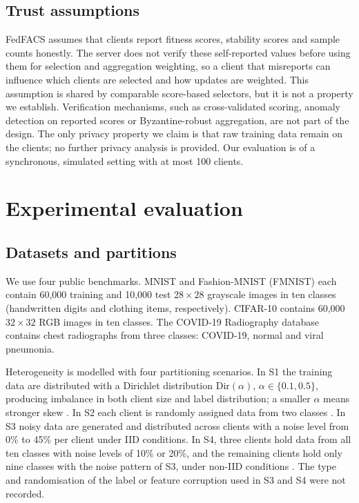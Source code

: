 \documentclass[pdflatex,sn-basic]{sn-jnl}
\begin{document}
\subsection{Trust assumptions}\label{sec4.10}
FedFACS assumes that clients report fitness scores, stability scores and sample counts honestly. The server does not verify these self-reported values before using them for selection and aggregation weighting, so a client that misreports can influence which clients are selected and how updates are weighted. This assumption is shared by comparable score-based selectors, but it is not a property we establish. Verification mechanisms, such as cross-validated scoring, anomaly detection on reported scores or Byzantine-robust aggregation, are not part of the design. The only privacy property we claim is that raw training data remain on the clients; no further privacy analysis is provided. Our evaluation is of a synchronous, simulated setting with at most 100 clients.

\section{Experimental evaluation}\label{sec5}

\subsection{Datasets and partitions}\label{sec5.1}
We use four public benchmarks. MNIST \citep{lecun2010} and Fashion-MNIST (FMNIST) \citep{xiao2017} each contain 60{,}000 training and 10{,}000 test $28\times28$ grayscale images in ten classes (handwritten digits and clothing items, respectively). CIFAR-10 \citep{krizhevsky2009} contains 60{,}000 $32\times32$ RGB images in ten classes. The COVID-19 Radiography database \citep{rahman2020} contains chest radiographs from three classes: COVID-19, normal and viral pneumonia.

Heterogeneity is modelled with four partitioning scenarios. In S1 the training data are distributed with a Dirichlet distribution $\mathrm{Dir}(\alpha)$, $\alpha\in\{0.1,0.5\}$, producing imbalance in both client size and label distribution; a smaller $\alpha$ means stronger skew \citep{iyer2023}. In S2 each client is randomly assigned data from two classes \citep{zhai2024}. In S3 noisy data are generated and distributed across clients with a noise level from 0\% to 45\% per client under IID conditions. In S4, three clients hold data from all ten classes with noise levels of 10\% or 20\%, and the remaining clients hold only nine classes with the noise pattern of S3, under non-IID conditions \citep{shi2023}. The type and randomisation of the label or feature corruption used in S3 and S4 were not recorded.
\end{document}
